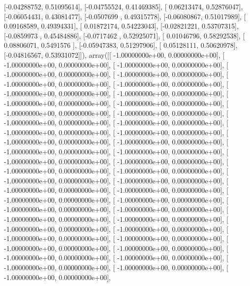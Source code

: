 \documentclass{article}
\begin{document}
       [-0.04288752,  0.51095614],
       [-0.04755524,  0.41469385],
       [ 0.06213474,  0.52876047],
       [-0.06054431,  0.43081477],
       [-0.0507699 ,  0.49315778],
       [-0.06080867,  0.51017989],
       [ 0.09168589,  0.49394331],
       [ 0.01872174,  0.54223043],
       [-0.02821221,  0.53707315],
       [-0.0859973 ,  0.45484886],
       [-0.0717462 ,  0.52925071],
       [ 0.01046796,  0.58292538],
       [ 0.08806071,  0.5491576 ],
       [-0.05947383,  0.51297906],
       [ 0.05128111,  0.50620978],
       [-0.04816567,  0.53931072]]), array([[ -1.00000000e+00,   0.00000000e+00],
       [ -1.00000000e+00,   0.00000000e+00],
       [ -1.00000000e+00,   0.00000000e+00],
       [ -1.00000000e+00,   0.00000000e+00],
       [ -1.00000000e+00,   0.00000000e+00],
       [ -1.00000000e+00,   0.00000000e+00],
       [ -1.00000000e+00,   0.00000000e+00],
       [ -1.00000000e+00,   0.00000000e+00],
       [ -1.00000000e+00,   0.00000000e+00],
       [ -1.00000000e+00,   0.00000000e+00],
       [ -1.00000000e+00,   0.00000000e+00],
       [ -1.00000000e+00,   0.00000000e+00],
       [ -1.00000000e+00,   0.00000000e+00],
       [ -1.00000000e+00,   0.00000000e+00],
       [ -1.00000000e+00,   0.00000000e+00],
       [ -1.00000000e+00,   0.00000000e+00],
       [ -1.00000000e+00,   0.00000000e+00],
       [ -1.00000000e+00,   0.00000000e+00],
       [ -1.00000000e+00,   0.00000000e+00],
       [ -1.00000000e+00,   0.00000000e+00],
       [ -1.00000000e+00,   0.00000000e+00],
       [ -1.00000000e+00,   0.00000000e+00],
       [ -1.00000000e+00,   0.00000000e+00],
       [ -1.00000000e+00,   0.00000000e+00],
       [ -1.00000000e+00,   0.00000000e+00],
       [ -1.00000000e+00,   0.00000000e+00],
       [ -1.00000000e+00,   0.00000000e+00],
       [ -1.00000000e+00,   0.00000000e+00],
       [ -1.00000000e+00,   0.00000000e+00],
       [ -1.00000000e+00,   0.00000000e+00],
       [ -1.00000000e+00,   0.00000000e+00],
       [ -1.00000000e+00,   0.00000000e+00],
       [ -1.00000000e+00,   0.00000000e+00],
       [ -1.00000000e+00,   0.00000000e+00],
       [ -1.00000000e+00,   0.00000000e+00],
       [ -1.00000000e+00,   0.00000000e+00],
       [ -1.00000000e+00,   0.00000000e+00],
       [ -1.00000000e+00,   0.00000000e+00],
       [ -1.00000000e+00,   0.00000000e+00],
       [ -1.00000000e+00,   0.00000000e+00],
       [ -1.00000000e+00,   0.00000000e+00],
       [ -1.00000000e+00,   0.00000000e+00],
       [ -1.00000000e+00,   0.00000000e+00],
       [ -1.00000000e+00,   0.00000000e+00],
       [ -1.00000000e+00,   0.00000000e+00],
       [ -1.00000000e+00,   0.00000000e+00],
\end{document}
